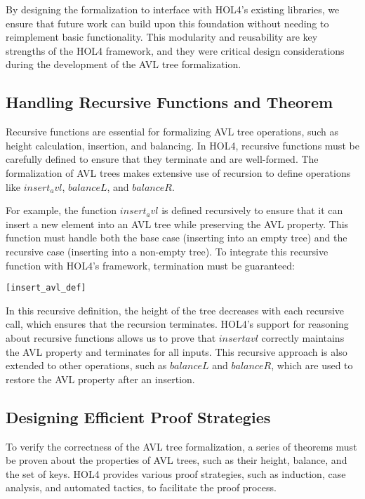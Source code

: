 By designing the formalization to interface with HOL4’s existing libraries, we ensure that future work can build upon this foundation without needing to reimplement basic functionality. This modularity and reusability are key strengths of the HOL4 framework, and they were critical design considerations during the development of the AVL tree formalization.

\subsection{Handling Recursive Functions and Theorem}

Recursive functions are essential for formalizing AVL tree operations, such as height calculation, insertion, and balancing. In HOL4, recursive functions must be carefully defined to ensure that they terminate and are well-formed. The formalization of AVL trees makes extensive use of recursion to define operations like \(insert_avl\), \(balanceL\), and \(balanceR\).

For example, the function \(insert_avl\) is defined recursively to ensure that it can insert a new element into an AVL tree while preserving the AVL property. This function must handle both the base case (inserting into an empty tree) and the recursive case (inserting into a non-empty tree). To integrate this recursive function with HOL4’s framework, termination must be guaranteed:

\begin{alltt}
	[insert_avl_def]
\end{alltt}

In this recursive definition, the height of the tree decreases with each recursive call, which ensures that the recursion terminates. HOL4’s support for reasoning about recursive functions allows us to prove that \(insert avl\) correctly maintains the AVL property and terminates for all inputs. This recursive approach is also extended to other operations, such as \(balanceL\) and \(balanceR\), which are used to restore the AVL property after an insertion.

\subsection{Designing Efficient Proof Strategies}

To verify the correctness of the AVL tree formalization, a series of theorems must be proven about the properties of AVL trees, such as their height, balance, and the set of keys. HOL4 provides various proof strategies, such as induction, case analysis, and automated tactics, to facilitate the proof process.

